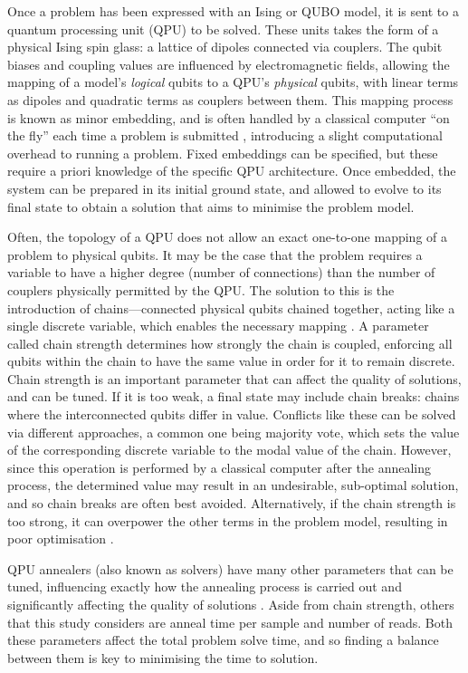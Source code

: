 \documentclass[12pt]{article}
\theoremstyle{definition}
\begin{document}
Once a problem has been expressed with an Ising or QUBO model, it is sent to a quantum processing unit (QPU) to be solved. These units takes the form of a physical Ising spin glass: a lattice of dipoles connected via couplers. The qubit biases and coupling values are influenced by electromagnetic fields, allowing the mapping of a model's \emph{logical} qubits to a QPU's \emph{physical} qubits, with linear terms as dipoles and quadratic terms as couplers between them. This mapping process is known as minor embedding, and is often handled by a classical computer ``on the fly'' each time a problem is submitted \cite{dwave_embedding}, introducing a slight computational overhead to running a problem. Fixed embeddings can be specified, but these require a priori knowledge of the specific QPU architecture. Once embedded, the system can be prepared in its initial ground state, and allowed to evolve to its final state to obtain a solution that aims to minimise the problem model.

Often, the topology of a QPU does not allow an exact one-to-one mapping of a problem to physical qubits. It may be the case that the problem requires a variable to have a higher degree (number of connections) than the number of couplers physically permitted by the QPU. The solution to this is the introduction of chains---connected physical qubits chained together, acting like a single discrete variable, which enables the necessary mapping \cite{dwave_embedding}. A parameter called chain strength determines how strongly the chain is coupled, enforcing all qubits within the chain to have the same value in order for it to remain discrete. Chain strength is an important parameter that can affect the quality of solutions, and can be tuned. If it is too weak, a final state may include chain breaks: chains where the interconnected qubits differ in value. Conflicts like these can be solved via different approaches, a common one being majority vote, which sets the value of the corresponding discrete variable to the modal value of the chain. However, since this operation is performed by a classical computer after the annealing process, the determined value may result in an undesirable, sub-optimal solution, and so chain breaks are often best avoided. Alternatively, if the chain strength is too strong, it can overpower the other terms in the problem model, resulting in poor optimisation \cite{dwave_embedguidance}.

QPU annealers (also known as solvers) have many other parameters that can be tuned, influencing exactly how the annealing process is carried out and significantly affecting the quality of solutions \cite{dwave_qpu}. Aside from chain strength, others that this study considers are anneal time per sample and number of reads. Both these parameters affect the total problem solve time, and so finding a balance between them is key to minimising the time to solution.
\end{document}
